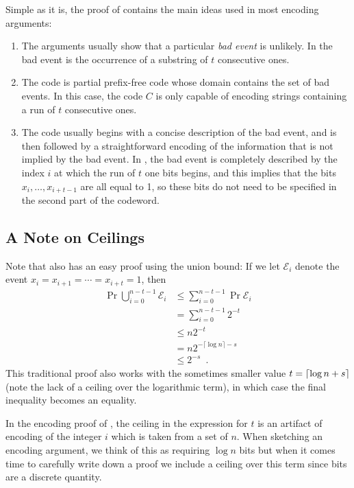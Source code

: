 \documentclass{patmorin}
\begin{document}
Simple as it is, the proof of  contains the main ideas
used in most encoding arguments:

\begin{enumerate}
\item The arguments usually show that a particular \emph{bad event} is
  unlikely. In  the bad event is the occurrence of a
  substring of $t$ consecutive ones.

\item The code is partial prefix-free code whose domain contains the
  set of bad events. In this case, the code $C$ is only capable of
  encoding strings containing a run of $t$ consecutive ones.

\item The code usually begins with a concise description of the bad
  event, and is then followed by a straightforward encoding of the
  information that is not implied by the bad event. In
  , the bad event is completely described by the index
  $i$ at which the run of $t$ one bits begins, and this implies that
  the bits $x_i,\ldots,x_{i+t-1}$ are all equal to 1, so these bits do
  not need to be specified in the second part of the codeword.
\end{enumerate}

\subsection{A Note on Ceilings}

Note that  also has an easy proof using the union
bound: If we let $\mathcal{E}_i$ denote the event
$x_i=x_{i+1}=\cdots=x_{i+t}=1$, then
\begin{align*}
  \Pr \bigcup_{i=0}^{n-t-1} \mathcal{E}_i
  & \le \sum_{i=0}^{n-t-1} \Pr\mathcal{E}_i  \tag{using the union bound}\\
  & = \sum_{i=0}^{n-t-1} 2^{-t}  \tag{using the independence of the $x_i$'s}\\
  & \le n2^{-t}  \tag{the sum has $n-t\le n$ identical terms}\\
  & = n2^{-\lceil\log n\rceil-s}  \tag{from the definition of $t$}\\
  & \le 2^{-s} \enspace .
\end{align*}
This traditional proof also works with the sometimes smaller value
$t={\lceil \log n+s \rceil}$ (note the lack of a ceiling over the logarithmic
term), in which case the final inequality becomes an equality.

In the encoding proof of , the ceiling in the
expression for $t$ is an artifact of encoding of the integer $i$ which
is taken from a set of $n$. When sketching an encoding argument, we
think of this as requiring $\log n$ bits but when it comes time to
carefully write down a proof we include a ceiling over this term since
bits are a discrete quantity.
\end{document}
